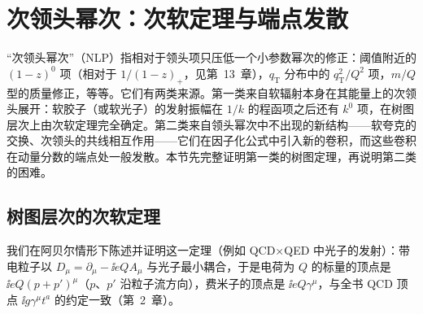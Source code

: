 \section{次领头幂次：次软定理与端点发散}\label{sec:power-nlp}

“次领头幂次”（NLP）指相对于领头项只压低一个小参数幂次的修正：阈值附近的 $(1-z)^0$ 项（相对于 $1/(1-z)_+$，见第~13~章），$q_{\mathrm T}$ 分布中的 $q_{\mathrm T}^2/Q^2$ 项，$m/Q$ 型的质量修正，等等。它们有两类来源。第一类来自软辐射本身在其能量上的次领头展开：软胶子（或软光子）的发射振幅在 $1/k$ 的程函项之后还有 $k^0$ 项，在树图层次上由次软定理完全确定。第二类来自领头幂次中不出现的新结构——软夸克的交换、次领头的共线相互作用——它们在因子化公式中引入新的卷积，而这些卷积在动量分数的端点处一般发散。本节先完整证明第一类的树图定理，再说明第二类的困难。

\subsection{树图层次的次软定理}

我们在阿贝尔情形下陈述并证明这一定理（例如 QCD$\times$QED 中光子的发射）：带电粒子以 $D_\mu=\partial_\mu-\ii eQA_\mu$ 与光子最小耦合，于是电荷为 $Q$ 的标量的顶点是 $\ii eQ(p+p')^\mu$（$p$、$p'$ 沿粒子流方向），费米子的顶点是 $\ii eQ\gamma^\mu$，与全书 QCD 顶点 $\ii g\gamma^\mu t^a$ 的约定一致（第~2~章）。

